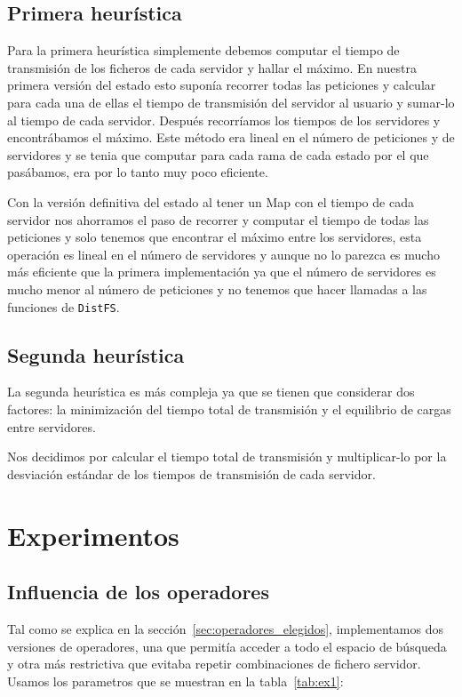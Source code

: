 \subsection{Primera heurística}

Para la primera heurística simplemente debemos computar el tiempo de transmisión de los ficheros de cada servidor y hallar
el máximo. En nuestra primera versión del estado esto suponía recorrer todas las peticiones y calcular para cada una de
ellas el tiempo de transmisión del servidor al usuario y sumar-lo al tiempo de cada servidor. Después recorríamos los tiempos
de los servidores y encontrábamos el máximo. Este método era lineal en el número de peticiones y de servidores y se tenia
que computar para cada rama de cada estado por el que pasábamos, era por lo tanto muy poco eficiente.

Con la versión definitiva del estado al tener un Map con el tiempo de cada servidor nos ahorramos el paso de
recorrer y computar el tiempo de todas las peticiones y solo tenemos que encontrar el máximo entre los servidores, 
esta operación es lineal en el número de servidores y aunque no lo parezca es mucho más eficiente que la primera
implementación ya que el número de servidores es mucho menor al número de peticiones y no tenemos que hacer
llamadas a las funciones de \texttt{DistFS}.

\subsection{Segunda heurística}

La segunda heurística es más compleja ya que se tienen que considerar dos factores: la minimización del tiempo total
de transmisión y el equilibrio de cargas entre servidores.

Nos decidimos por calcular el tiempo total de transmisión y multiplicar-lo por la desviación estándar de los tiempos
de transmisión de cada servidor.

\section{Experimentos}

\subsection{Influencia de los operadores}

Tal como se explica en la sección~\ref{sec:operadores_elegidos}, implementamos dos versiones de operadores,
una que permitía acceder a todo el espacio de búsqueda y otra más restrictiva que evitaba repetir combinaciones
de fichero servidor. Usamos los parametros que se muestran en la tabla~\ref{tab:ex1}:

